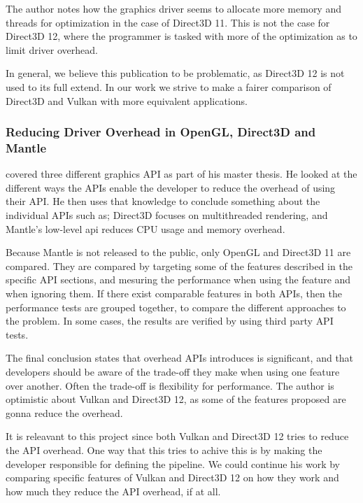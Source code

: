 The author  notes how the graphics driver seems to allocate more memory and threads for optimization in the case of Direct3D 11.
This is not the case for Direct3D 12, where the programmer is tasked with more of the optimization as to limit driver overhead.


In general, we believe this publication to be problematic, as Direct3D 12 is not used to its full extend.
In our work we strive to make a fairer comparison of Direct3D and Vulkan with more equivalent applications.


\subsubsection{Reducing Driver Overhead in OpenGL, Direct3D and Mantle}

\citet{dobersberger_2015_reducing} covered three different graphics \gls{API} as part of his master thesis. 
He looked at the different ways the \glspl{API} enable the developer to reduce the overhead of using their \gls{API}. 
He then uses that knowledge to conclude something about the individual \glspl{API} such as; Direct3D focuses on multithreaded rendering, and Mantle's low-level api reduces \gls{CPU} usage and memory overhead.

Because Mantle is not released to the public, only OpenGL and Direct3D 11 are compared.
They are compared by targeting some of the features described in the specific \gls{API} sections, and mesuring the performance when using the feature and when ignoring them.
If there exist comparable features in both \glspl{API}, then the performance tests are grouped together, to compare the different approaches to the problem.
In some cases, the results are verified by using third party \gls{API} tests.

The final conclusion states that overhead \glspl{API} introduces is significant, and that developers should be aware of the trade-off they make when using one feature over another.
Often the trade-off is flexibility for performance.
The author is optimistic about Vulkan and Direct3D 12, as some of the features proposed are gonna reduce the overhead.

It is releavant to this project  since both Vulkan and Direct3D 12 tries to reduce the \gls{API} overhead.
One way that this tries to achive this is by making the developer responsible for defining the pipeline.
We could continue his work by comparing specific features of Vulkan and Direct3D 12 on how they work and how much they reduce the \gls{API} overhead, if at all.


